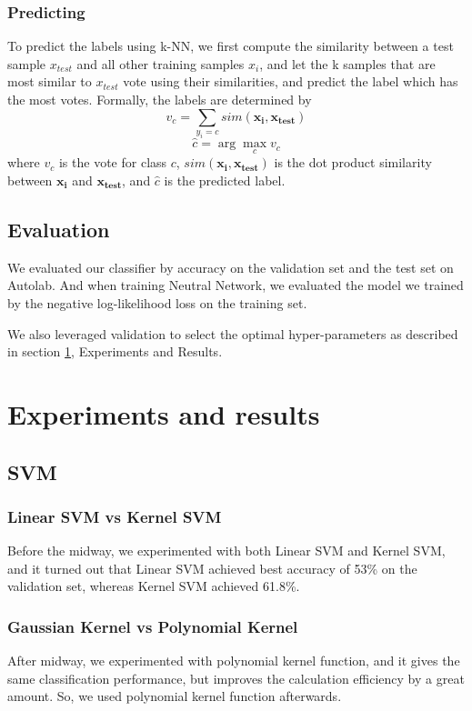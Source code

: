 \documentclass{article} %
\begin{document}
\subsubsection{Predicting}
To predict the labels using k-NN, we first compute the similarity between a test sample $x_{test}$ and all other training samples $x_{i}$, and let the k samples that are most similar to $x_{test}$ vote using their similarities, and predict the label which has the most votes. Formally, the labels are determined by
\begin{equation}
v_{c}=\sum_{y_{i}=c}sim(\mathbf{x_{i}},\mathbf{x_{test}})
\end{equation}
\begin{equation}
\hat{c}=\arg\max_{c}v_{c}
\end{equation}
where $v_{c}$ is the vote for class $c$, $sim(\mathbf{x_{i}},\mathbf{x_{test}})$ is the dot product similarity between $\mathbf{x_{i}}$ and $\mathbf{x_{test}}$, and $\hat{c}$ is the predicted label.
\subsection{Evaluation}

We evaluated our classifier by accuracy on the validation set and the test set on Autolab. And when training Neutral Network, we evaluated the model we trained by the negative log-likelihood loss on the training set.

We also leveraged validation to select the optimal hyper-parameters as described in section \ref{experiments}, Experiments and Results.
\section{Experiments and results}
\label{experiments}

\subsection{SVM}

\subsubsection{Linear SVM vs Kernel SVM}
Before the midway, we experimented with both Linear SVM and Kernel SVM, and it turned out that Linear SVM achieved best accuracy of 53\% on the validation set, whereas Kernel SVM achieved 61.8\%.

\subsubsection{Gaussian Kernel vs Polynomial Kernel}
After midway, we experimented with polynomial kernel function, and it gives the same classification performance, but improves the calculation efficiency by a great amount. So, we used polynomial kernel function afterwards.
\end{document}
